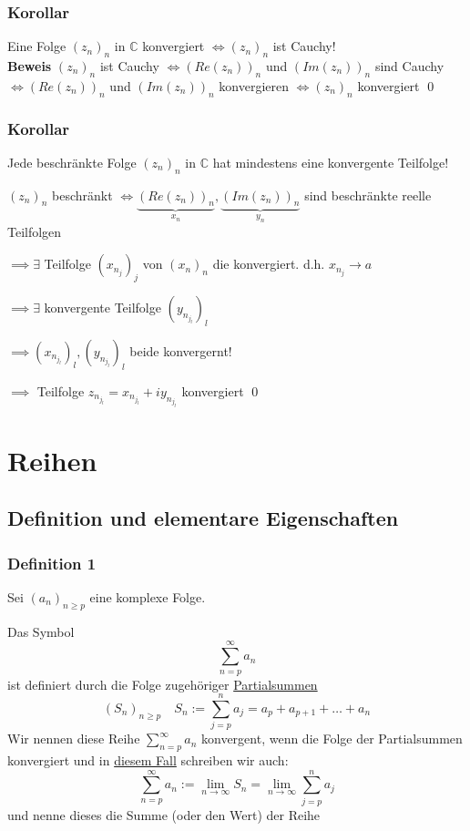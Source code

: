 \documentclass[fleqn]{scrbook}
\renewenvironment{proof}{{\bfseries Beweis }}{\qed}
\begin{document}
\subsection{Korollar}
Eine Folge $(z_n)_n$ in $\mathbb{C}$ konvergiert $\Leftrightarrow (z_n)_n$ ist Cauchy!\\
\begin{proof}
$(z_n)_n$ ist Cauchy $\Leftrightarrow (Re(z_n))_n$ und $(Im(z_n))_n$ sind Cauchy $\Leftrightarrow (Re(z_n))_n$ und $(Im(z_n))_n$ konvergieren $\Leftrightarrow (z_n)_n$ konvergiert
\end{proof}

\subsection{Korollar} Jede beschränkte Folge $(z_n)_n$ in $\mathbb{C}$ hat mindestens eine konvergente Teilfolge!

\begin{proof}
$(z_n)_n$ beschränkt $\Leftrightarrow \underbrace{(Re(z_n))_n}_{x_n}, \underbrace{(Im(z_n))_n}_{y_n}$ sind beschränkte reelle Teilfolgen

$\implies \exists$ Teilfolge $(x_{n_j})_j$ von $(x_n)_n$ die konvergiert. d.h. $x_{n_j} \rightarrow a$

$\implies \exists$ konvergente Teilfolge $(y_{n_{j_l}})_l$

$\implies (x_{n_{j_l}})_l, (y_{n_{j_l}})_l$ beide konvergernt!

$\implies$ Teilfolge $z_{n_{j_l}} = x_{n_{j_l}} + iy_{n_{j_l}}$ konvergiert
\end{proof}

\chapter{Reihen}
\section{Definition und elementare Eigenschaften}

\subsection{Definition 1}

Sei $(a_n)_{n\geq p}$ eine komplexe Folge.

Das Symbol 
\[\sum_{n=p}^\infty a_n\]
ist definiert durch die Folge zugehöriger \underline{Partialsummen}
\[(S_n)_{n \geq p} \quad S_n := \sum_{j=p}^n a_j = a_p +a_{p+1} + \ldots + a_n \]
Wir nennen diese Reihe $\sum_{n=p}^\infty a_n$ konvergent, wenn die Folge der Partialsummen konvergiert und in \underline{diesem Fall} schreiben wir auch:
\[\sum_{n=p}^\infty a_n := \lim_{n\to \infty} S_n = \lim_{n\to \infty} \sum_{j=p}^n a_j\]
und nenne dieses die Summe (oder den Wert) der Reihe
\end{document}
